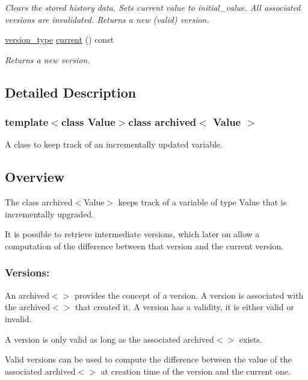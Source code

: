 \begin{DoxyCompactItemize}
\begin{DoxyCompactList}\small\item\em Clears the stored history data. Sets current value to initial\+\_\+value. All associated versions are invalidated. Returns a new (valid) version. \end{DoxyCompactList}\item 
\hyperlink{classarchived_a75b8e571e7c6aca9432b9aa2ba601c00}{version\+\_\+type} \hyperlink{classarchived_a7b7505259596c1deaff30a9fb7942bb5}{current} () const 
\begin{DoxyCompactList}\small\item\em Returns a new version. \end{DoxyCompactList}\end{DoxyCompactItemize}


\subsection{Detailed Description}
\subsubsection*{template$<$class Value$>$class archived$<$ Value $>$}

A class to keep track of an incrementally updated variable. 

\subsection*{Overview}

The class archived$<$\+Value$>$ keeps track of a variable of type Value that is incrementally upgraded.

It is possible to retrieve intermediate versions, which later on allow a computation of the difference between that version and the current version.

\subsubsection*{Versions\+:}

An archived$<$$>$ provides the concept of a version. A version is associated with the archived$<$$>$ that created it. A version has a validity, it is either valid or invalid.

A version is only valid as long as the associated archived$<$$>$ exists.

Valid versions can be used to compute the difference between the value of the associated archived$<$$>$ at creation time of the version and the current one.

